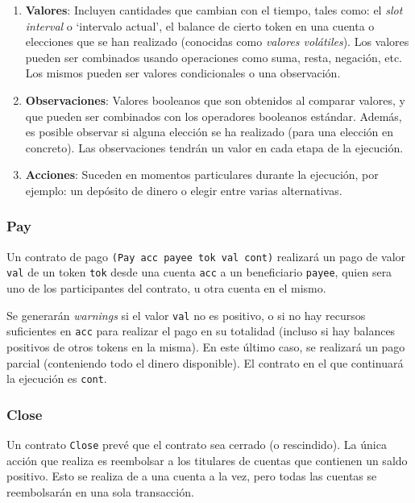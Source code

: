 \documentclass[12pt]{book}
\begin{document}
\begin{enumerate}
    \item \textbf{Valores}: Incluyen cantidades que cambian con el tiempo, tales como: el \textit{slot interval} o `intervalo actual', el balance de cierto token en una cuenta o elecciones que se han realizado (conocidas como \textit{valores volátiles}). Los valores pueden ser combinados usando operaciones como suma, resta, negación, etc. Los mismos pueden ser valores condicionales o una observación.

    \item \textbf{Observaciones}: Valores booleanos que son obtenidos al comparar valores, y que pueden ser combinados con los operadores booleanos estándar. Además, es posible observar si alguna elección se ha realizado (para una elección en concreto). Las observaciones tendrán un valor en cada etapa de la ejecución.

    \item \textbf{Acciones}: Suceden en momentos particulares durante la ejecución, por ejemplo: un depósito de dinero o elegir entre varias alternativas.
\end{enumerate}


\subsubsection{Pay}
Un contrato de pago \texttt{(Pay acc payee tok val cont)} realizará un pago de valor \texttt{val} de un token \texttt{tok} desde una cuenta \texttt{acc} a un beneficiario \texttt{payee}, quien sera uno de los participantes del contrato, u otra cuenta en el mismo.

Se generarán \textit{warnings} si el valor \texttt{val} no es positivo, o si no hay recursos suficientes en \texttt{acc} para realizar el pago en su totalidad (incluso si hay balances positivos de otros tokens en la misma). En este último caso, se realizará un pago parcial (conteniendo todo el dinero disponible). El contrato en el que continuará la ejecución es \texttt{cont}.

\subsubsection{Close}

Un contrato \texttt{Close} prevé que el contrato sea cerrado (o rescindido). La única acción que realiza es reembolsar a los titulares de cuentas que contienen un saldo positivo. Esto se realiza de a una cuenta a la vez, pero todas las cuentas se reembolsarán en una sola transacción.
\end{document}
